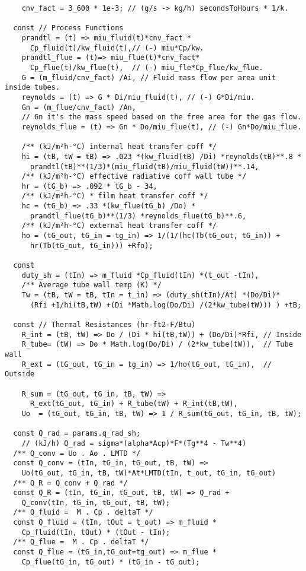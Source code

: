 \begin{verbatim}
    cnv_fact = 3_600 * 1e-3; // (g/s -> kg/h) secondsToHours * 1/k.

  const // Process Functions
    prandtl = (t) => miu_fluid(t)*cnv_fact *
      Cp_fluid(t)/kw_fluid(t),// (-) miu*Cp/kw.
    prandtl_flue = (t)=> miu_flue(t)*cnv_fact*
      Cp_flue(t)/kw_flue(t),  // (-) miu_fle*Cp_flue/kw_flue.
    G = (m_fluid/cnv_fact) /Ai, // Fluid mass flow per area unit inside tubes.
    reynolds = (t) => G * Di/miu_fluid(t), // (-) G*Di/miu.
    Gn = (m_flue/cnv_fact) /An, 
    // Gn it's the mass speed based on the free area for the gas flow.
    reynolds_flue = (t) => Gn * Do/miu_flue(t), // (-) Gn*Do/miu_flue.
      
    /** (kJ/m²h-°C) internal heat transfer coff */
    hi = (tB, tW = tB) => .023 *(kw_fluid(tB) /Di) *reynolds(tB)**.8 *
      prandtl(tB)**(1/3)*(miu_fluid(tB)/miu_fluid(tW))**.14,
    /** (kJ/m²h-°C) effective radiative coff wall tube */
    hr = (tG_b) => .092 * tG_b - 34,
    /** (kJ/m²h-°C) * film heat transfer coff */
    hc = (tG_b) => .33 *(kw_flue(tG_b) /Do) *
      prandtl_flue(tG_b)**(1/3) *reynolds_flue(tG_b)**.6,
    /** (kJ/m²h-°C) external heat transfer coff */
    ho = (tG_out, tG_in = tg_in) => 1/(1/(hc(Tb(tG_out, tG_in)) + 
      hr(Tb(tG_out, tG_in))) +Rfo);
  
  const
    duty_sh = (tIn) => m_fluid *Cp_fluid(tIn) *(t_out -tIn),
    /** Average tube wall temp (K) */
    Tw = (tB, tW = tB, tIn = t_in) => (duty_sh(tIn)/At) *(Do/Di)*
      (Rfi +1/hi(tB,tW) +(Di *Math.log(Do/Di) /(2*kw_tube(tW))) ) +tB;

  const // Thermal Resistances (hr-ft2-F/Btu)
    R_int = (tB, tW) => Do / (Di * hi(tB,tW)) + (Do/Di)*Rfi, // Inside
    R_tube= (tW) => Do * Math.log(Do/Di) / (2*kw_tube(tW)),  // Tube wall
    R_ext = (tG_out, tG_in = tg_in) => 1/ho(tG_out, tG_in),  // Outside
    
    R_sum = (tG_out, tG_in, tB, tW) => 
      R_ext(tG_out, tG_in) + R_tube(tW) + R_int(tB,tW),
    Uo  = (tG_out, tG_in, tB, tW) => 1 / R_sum(tG_out, tG_in, tB, tW);
  
  const Q_rad = params.q_rad_sh; 
    // (kJ/h) Q_rad = sigma*(alpha*Acp)*F*(Tg**4 - Tw**4)
  /** Q_conv = Uo . Ao . LMTD */
  const Q_conv = (tIn, tG_in, tG_out, tB, tW) => 
    Uo(tG_out, tG_in, tB, tW)*At*LMTD(tIn, t_out, tG_in, tG_out)
  /** Q_R = Q_conv + Q_rad */
  const Q_R = (tIn, tG_in, tG_out, tB, tW) => Q_rad + 
    Q_conv(tIn, tG_in, tG_out, tB, tW);
  /** Q_fluid =  M . Cp . deltaT */
  const Q_fluid = (tIn, tOut = t_out) => m_fluid * 
    Cp_fluid(tIn, tOut) * (tOut - tIn);
  /** Q_flue =  M . Cp . deltaT */
  const Q_flue = (tG_in,tG_out=tg_out) => m_flue * 
    Cp_flue(tG_in, tG_out) * (tG_in - tG_out);
  

\end{verbatim}
